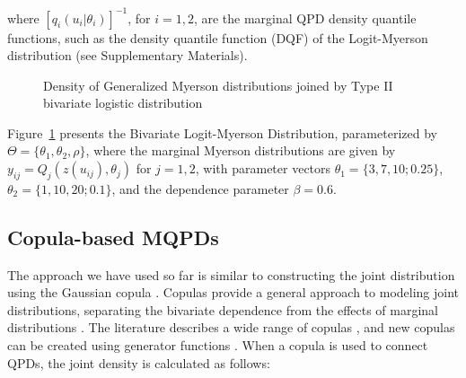 \documentclass[
  fleqn,
  deca,
  blindrev
]{informs4}
\begin{document}
where \([q_i(u_i\vert\theta_i)]^{-1}\), for \(i=1,2\), are the marginal
QPD density quantile functions, such as the density quantile function
(DQF) of the Logit-Myerson distribution (see Supplementary Materials).

\begin{figure}


\caption{\label{fig-bi-logitmyerson}Density of Generalized Myerson
distributions joined by Type II bivariate logistic distribution}

\end{figure}%

Figure~\ref{fig-bi-logitmyerson} presents the Bivariate Logit-Myerson
Distribution, parameterized by \(\Theta=\{\theta_1, \theta_2, \rho\}\),
where the marginal Myerson distributions are given by
\(y_{ij}=Q_j(z(u_{ij}),\theta_j)\) for \(j=1,2\), with parameter vectors
\(\theta_1=\{3,7,10;0.25\}\), \(\theta_2=\{1,10,20;0.1\}\), and the
dependence parameter \(\beta=0.6\).

\subsection{Copula-based MQPDs}\label{copula-based-mqpds}

The approach we have used so far is similar to constructing the joint
distribution using the Gaussian copula
\citep{hoff2007ExtendingRankLikelihood}. Copulas provide a general
approach to modeling joint distributions, separating the bivariate
dependence from the effects of marginal distributions
\citep{kurowicka2006UncertaintyAnalysisHigh}. The literature describes a
wide range of copulas
\citep{genest2007EverythingYouAlways, smith2013BayesianApproachesCopula, kurowicka2011DependenceModelingVine},
and new copulas can be created using generator functions
\citep{durrleman2000SimpleTransformationCopulas}. When a copula is used
to connect QPDs, the joint density is calculated as follows:
\end{document}
